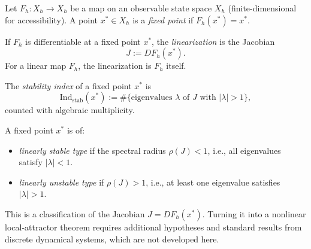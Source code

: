 \begin{definition}
\label{def:iteration-map}
Let $F_h: X_h \to X_h$ be a map on an observable state space $X_h$ (finite-dimensional for accessibility).
A point $x^* \in X_h$ is a \emph{fixed point} if $F_h(x^*) = x^*$.
\end{definition}

\begin{definition}
\label{def:linearization}
If $F_h$ is differentiable at a fixed point $x^*$, the \emph{linearization} is the Jacobian
\[
J := DF_h(x^*).
\]
For a linear map $F_h$, the linearization is $F_h$ itself.
\end{definition}

\begin{definition}
\label{def:stability-index}
The \emph{stability index} of a fixed point $x^*$ is
\[
\mathrm{Ind}_{\mathrm{stab}}(x^*) := \#\{ \text{eigenvalues } \lambda \text{ of } J \text{ with } |\lambda| > 1 \},
\]
counted with algebraic multiplicity.
\end{definition}

\begin{definition}
\label{def:stable-unstable}
A fixed point $x^*$ is of:
\begin{itemize}[itemsep=0.2em]
\item \emph{linearly stable type} if the spectral radius $\rho(J) < 1$, i.e., all eigenvalues satisfy $|\lambda| < 1$.
\item \emph{linearly unstable type} if $\rho(J) > 1$, i.e., at least one eigenvalue satisfies $|\lambda| > 1$.
\end{itemize}
This is a classification of the Jacobian \(J = DF_h(x^*)\). Turning it into a
nonlinear local-attractor theorem requires additional hypotheses and standard
results from discrete dynamical systems, which are not developed here.
\end{definition}

